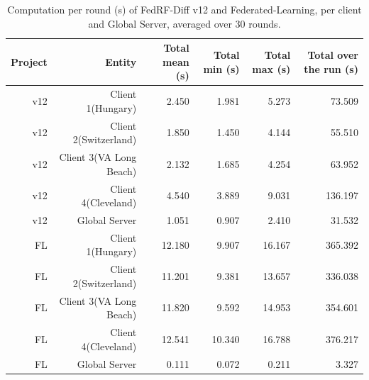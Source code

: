 \begin{table}[t]
\centering
\small
\caption{Computation per round (s) of FedRF-Diff v12 and Federated-Learning, per client and Global Server, averaged over 30 rounds.}
\label{tab:v12_fl_comp}
\begin{tabular}{rrrrrr}
\toprule
Project & Entity & Total mean (s) & Total min (s) & Total max (s) & Total over the run (s) \\
\midrule
v12 & Client 1(Hungary) & 2.450 & 1.981 & 5.273 & 73.509 \\
v12 & Client 2(Switzerland) & 1.850 & 1.450 & 4.144 & 55.510 \\
v12 & Client 3(VA Long Beach) & 2.132 & 1.685 & 4.254 & 63.952 \\
v12 & Client 4(Cleveland) & 4.540 & 3.889 & 9.031 & 136.197 \\
v12 & Global Server & 1.051 & 0.907 & 2.410 & 31.532 \\
FL & Client 1(Hungary) & 12.180 & 9.907 & 16.167 & 365.392 \\
FL & Client 2(Switzerland) & 11.201 & 9.381 & 13.657 & 336.038 \\
FL & Client 3(VA Long Beach) & 11.820 & 9.592 & 14.953 & 354.601 \\
FL & Client 4(Cleveland) & 12.541 & 10.340 & 16.788 & 376.217 \\
FL & Global Server & 0.111 & 0.072 & 0.211 & 3.327 \\
\bottomrule
\end{tabular}
\end{table}
